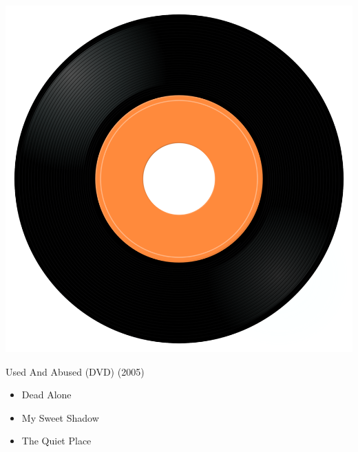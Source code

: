\begin{minipage}[t]{0.25\textwidth}\vspace{0pt}
\captionsetup{type=figure}
\includegraphics[width=\textwidth]{Images/cover.png}
\caption*{Used And Abused (DVD) (2005)}
\end{minipage}
\begin{minipage}[t]{0.25\textwidth}\vspace{0pt}
\begin{itemize}[nosep,leftmargin=1em,labelwidth=*,align=left]
	\setlength{\itemsep}{0pt}
	\item Dead Alone
	\item My Sweet Shadow
	\item The Quiet Place
\end{itemize}
\end{minipage}
